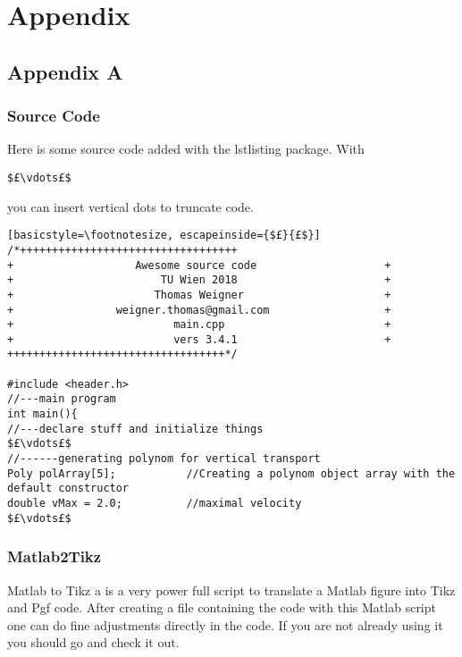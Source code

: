 \chapter{Appendix}\label{chap:appendix}
\section{Appendix A}\label{sec:appendix_a}
\subsection{Source Code}\label{sec:source_code}
Here is some source code added with the lstlisting package. With \begin{verbatim}$£\vdots£$\end{verbatim} you can insert vertical dots to truncate code.
\begin{lstlisting}[basicstyle=\footnotesize, escapeinside={$£}{£$}]
/*++++++++++++++++++++++++++++++++++
+                   Awesome source code                    +
+                       TU Wien 2018                       +
+                      Thomas Weigner                      +
+                weigner.thomas@gmail.com                  +
+                         main.cpp                         +
+                         vers 3.4.1                       +
++++++++++++++++++++++++++++++++++*/

#include <header.h>
//---main program
int main(){
//---declare stuff and initialize things
$£\vdots£$
//------generating polynom for vertical transport
Poly polArray[5];           //Creating a polynom object array with the default constructor
double vMax = 2.0;          //maximal velocity
$£\vdots£$
\end{lstlisting}

\subsection{Matlab2Tikz}\label{sec:matlab2tikz}
Matlab to Tikz a is a very power full script to translate a Matlab figure into Tikz and Pgf code. After creating a file containing the code with this Matlab script one can do fine adjustments directly in the code. If you are not already using it you should go and check it out.